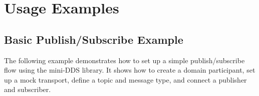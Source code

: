\documentclass[12pt]{report}
\begin{document}

\chapter{Usage Examples}

\section{Basic Publish/Subscribe Example}
The following example demonstrates how to set up a simple publish/subscribe flow using the mini-DDS library. It shows how to create a domain participant, set up a mock transport, define a topic and message type, and connect a publisher and subscriber.
\end{document}
